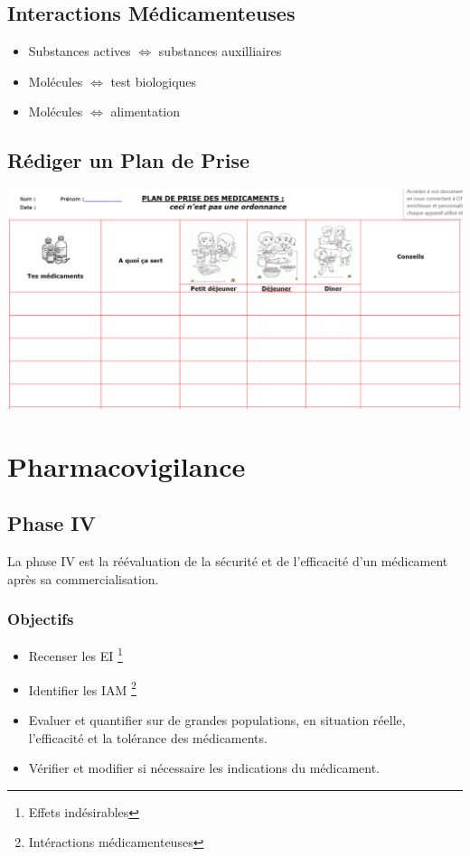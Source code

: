 \documentclass[11pt]{article}
\begin{document}
\subsection{Interactions Médicamenteuses}
\label{sec:org00658e5}
\begin{itemize}
\item Substances actives \(\Leftrightarrow\) substances auxilliaires
\item Molécules \(\Leftrightarrow\) test biologiques
\item Molécules \(\Leftrightarrow\) alimentation
\end{itemize}
\subsection{Rédiger un Plan de Prise}
\label{sec:org2fb2716}
\begin{center}
\includegraphics[width=.9\linewidth]{./plandeprise.png}
\end{center}
\section{Pharmacovigilance}
\label{sec:orgcabd6ee}
\setlength{\parindent}{0pt}
\subsection{Phase IV}
\label{sec:org18fd0ca}
La phase IV est la réévaluation de la sécurité et de l'efficacité d'un médicament après sa commercialisation.
\subsubsection{Objectifs}
\label{sec:org8f503bc}
\begin{itemize}
\item Recenser les EI \footnote{Effets indésirables}
\item Identifier les IAM \footnote{Intéractions médicamenteuses}
\item Evaluer et quantifier sur de grandes populations, en situation réelle, l'efficacité et la tolérance des médicaments.
\item Vérifier et modifier si nécessaire les indications du médicament.
\end{itemize}
\end{document}
